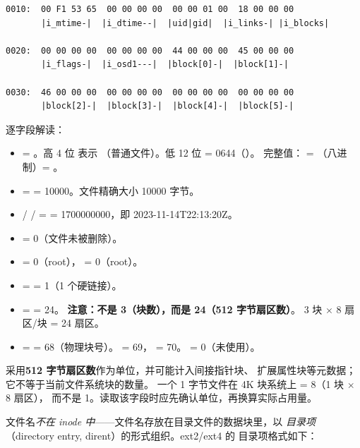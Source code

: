 \begin{filesystemlayout}
\begin{lstlisting}
0010:  00 F1 53 65  00 00 00 00  00 00 01 00  18 00 00 00
       |i_mtime-|  |i_dtime--|  |uid|gid|  |i_links-| |i_blocks|

0020:  00 00 00 00  00 00 00 00  44 00 00 00  45 00 00 00
       |i_flags-|  |i_osd1---|  |block[0]-|  |block[1]-|

0030:  46 00 00 00  00 00 00 00  00 00 00 00  00 00 00 00
       |block[2]-|  |block[3]-|  |block[4]-|  |block[5]-|
\end{lstlisting}

逐字段解读：

\begin{itemize}\tightlist
\item {} = 。高 4 位  表示
  （普通文件）。低 12 位  = 0644（）。
  完整值： = （八进制）= 。
\item {} =  = 10000。文件精确大小 10000 字节。
\item {} /  /  =  =
  1700000000，即 2023-11-14T22:13:20Z。
\item {} = 0（文件未被删除）。
\item {} = 0（root）， = 0（root）。
\item {} =  = 1（1 个硬链接）。
\item {} =  = 24。
  \textbf{注意：不是 3（块数），而是 24（512 字节扇区数）}。
  3 块 $\times$ 8 扇区/块 = 24 扇区。
\item {} =  = 68（物理块号）。
   = 69， = 70。
   = 0（未使用）。
\end{itemize}

\begin{warningbox}
 采用\textbf{512 字节扇区数}作为单位，并可能计入间接指针块、
扩展属性块等元数据；它不等于当前文件系统块的数量。
一个 1 字节文件在 4K 块系统上  = 8（1 块 $\times$ 8 扇区），
而不是 1。读取该字段时应先确认单位，再换算实际占用量。
\end{warningbox}


文件名\emph{不在 inode 中}——文件名存放在目录文件的数据块里，以
\emph{目录项}（directory entry, dirent）的形式组织。ext2/ext4 的
目录项格式如下：


\end{filesystemlayout}
